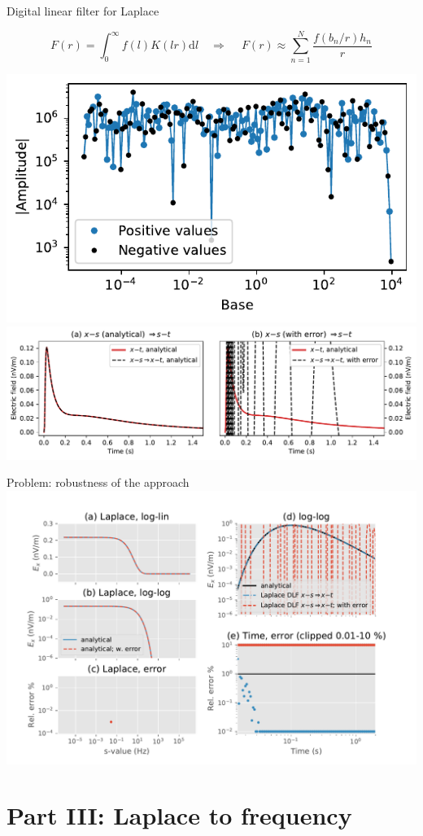 \documentclass[xcolor=svgnames, usepdftitle=false, aspectratio=169]{beamer}
\newcommand{\dra}{\ensuremath{\Rightarrow }~}
\newcommand{\mr}[1]{\mathrm{#1}}
\newcommand{\ato}{\addtocounter{framenumber}{1}}
\begin{document}
\begin{frame}  %
  {Digital linear filter for Laplace}

  $$
  F(r) = \int^\infty_0 f(l)K(l r)\mr{d}l \quad \dra \quad
  F(r) \approx \sum^N_{n=1} \frac{f(b_n/r) h_n}{r}
  $$

  \includegraphics[width=.47\linewidth]{filter-space}\hfill
  \includegraphics[clip, trim=0 0 320 0, width=.47\linewidth]{s-t_time}%

\end{frame}


\begin{frame}[t]
  {Problem: robustness of the approach}
  ~\vspace{-.8cm}\\
  \includegraphics[trim=30 0 40 35, clip, width=.83\linewidth]{s-t_time-2}%

\end{frame}

\ato
\section{Part III: Laplace to frequency} %
\end{document}
